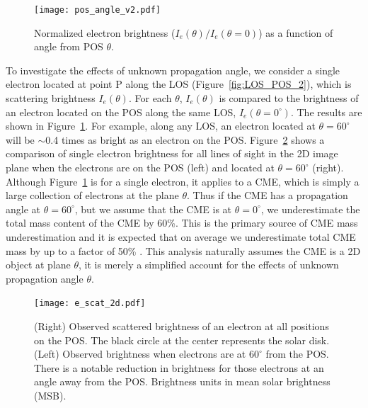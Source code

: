 \begin{figure}[!t]
\begin{center}
\texttt{[image: pos\_angle\_v2.pdf]}
\caption[Electron brightness as function of angle]{Normalized electron brightness ($I_e(\theta)/I_e(\theta=0)$) as a function of angle from POS $\theta$.}
\label{fig:pos_angle}
\end{center}
\end{figure}
To investigate the effects of unknown propagation angle, we consider a single electron located at point P along the LOS (Figure~\ref{fig:LOS_POS_2}), which is scattering brightness $I_e(\theta)$. For each $\theta$, $I_e(\theta)$ is compared to the brightness of an electron located on the POS along the same LOS, $I_e(\theta=0^{\circ})$. The results are shown in Figure~\ref{fig:pos_angle}. For example, along any LOS, an electron located at $\theta=60^{\circ}$ will be $\sim$0.4 times as bright as an electron on the POS. 
%
%
Figure~\ref{fig:scattering2d} shows a comparison of single electron brightness for all lines of sight in the 2D image plane when the electrons are on the POS (left) and located at $\theta=60^{\circ}$ (right). 
%
%
Although Figure~\ref{fig:pos_angle} is for a single electron, it applies to a CME, which is simply a large collection of electrons at the plane $\theta$. Thus if the CME has a propagation angle at $\theta=60^{\circ}$, but we assume that the CME is at $\theta=0^{\circ}$, we underestimate the total mass content of the CME by 60\%. This is the primary source of CME mass underestimation and it is expected that on average we underestimate total CME mass by up to a factor of 50\% \citep{vou00}. This analysis naturally assumes the CME is a 2D object at plane $\theta$, it is merely a simplified account for the effects of unknown propagation angle $\theta$.

\begin{figure}[!t]
\begin{center}
\texttt{[image: e\_scat\_2d.pdf]}
\caption[Electron brightness on and away the POS]{(Right) Observed scattered brightness of an electron at all positions on the POS. The black circle at the center represents the solar disk. (Left) Observed brightness when electrons are at $60^{\circ}$ from the POS. There is a notable reduction in brightness for those electrons at an angle away from the POS. Brightness units in mean solar brightness (MSB).}
\label{fig:scattering2d}
\end{center}
\end{figure}

